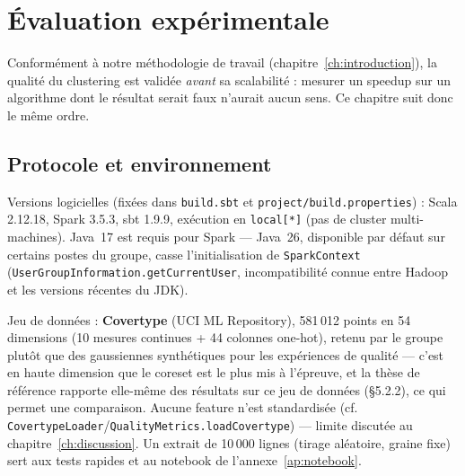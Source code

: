 %

\chapter{Évaluation expérimentale}
\label{ch:evaluation}

Conformément à notre méthodologie de travail (chapitre~\ref{ch:introduction}),
la qualité du clustering est validée \emph{avant} sa scalabilité : mesurer un
speedup sur un algorithme dont le résultat serait faux n'aurait aucun sens.
Ce chapitre suit donc le même ordre.

\section{Protocole et environnement}
\label{sec:eval-setup}


Versions logicielles (fixées dans \texttt{build.sbt} et
\texttt{project/build.properties}) : Scala 2.12.18, Spark 3.5.3, sbt 1.9.9,
exécution en \texttt{local[*]} (pas de cluster multi-machines). Java~17 est
requis pour Spark --- Java~26, disponible par défaut sur certains postes du
groupe, casse l'initialisation de \texttt{SparkContext}
(\texttt{UserGroupInformation.getCurrentUser}, incompatibilité connue entre
Hadoop et les versions récentes du JDK).

Jeu de données : \textbf{Covertype} (UCI ML Repository), 581\,012 points en
54 dimensions (10 mesures continues + 44 colonnes one-hot), retenu par le
groupe plutôt que des gaussiennes synthétiques pour les expériences de
qualité --- c'est en haute dimension que le coreset est le plus mis à
l'épreuve, et la thèse de référence rapporte elle-même des résultats sur ce
jeu de données (§5.2.2), ce qui permet une comparaison. Aucune feature n'est
standardisée (cf. \texttt{CovertypeLoader}/\texttt{QualityMetrics.loadCovertype}) ---
limite discutée au chapitre~\ref{ch:discussion}. Un extrait de 10\,000 lignes
(tirage aléatoire, graine fixe) sert aux tests rapides et au notebook de
l'annexe~\ref{ap:notebook}.

